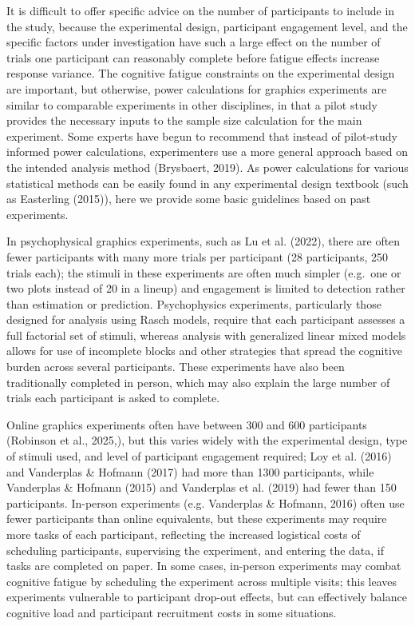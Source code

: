 \documentclass[
  10pt,
  letterpaper,
  DIV=11,
  numbers=noendperiod]{scrartcl}
\begin{document}
It is difficult to offer specific advice on the number of participants
to include in the study, because the experimental design, participant
engagement level, and the specific factors under investigation have such
a large effect on the number of trials one participant can reasonably
complete before fatigue effects increase response variance. The
cognitive fatigue constraints on the experimental design are important,
but otherwise, power calculations for graphics experiments are similar
to comparable experiments in other disciplines, in that a pilot study
provides the necessary inputs to the sample size calculation for the
main experiment. Some experts have begun to recommend that instead of
pilot-study informed power calculations, experimenters use a more
general approach based on the intended analysis method (Brysbaert,
2019). As power calculations for various statistical methods can be
easily found in any experimental design textbook (such as Easterling
(2015)), here we provide some basic guidelines based on past
experiments.

In psychophysical graphics experiments, such as Lu et al. (2022), there
are often fewer participants with many more trials per participant (28
participants, 250 trials each); the stimuli in these experiments are
often much simpler (e.g.~one or two plots instead of 20 in a lineup) and
engagement is limited to detection rather than estimation or prediction.
Psychophysics experiments, particularly those designed for analysis
using Rasch models, require that each participant assesses a full
factorial set of stimuli, whereas analysis with generalized linear mixed
models allows for use of incomplete blocks and other strategies that
spread the cognitive burden across several participants. These
experiments have also been traditionally completed in person, which may
also explain the large number of trials each participant is asked to
complete.

Online graphics experiments often have between 300 and 600 participants
(Robinson et al., 2025,), but this varies widely with the experimental
design, type of stimuli used, and level of participant engagement
required; Loy et al. (2016) and Vanderplas \& Hofmann (2017) had more
than 1300 participants, while Vanderplas \& Hofmann (2015) and
Vanderplas et al. (2019) had fewer than 150 participants. In-person
experiments (e.g. Vanderplas \& Hofmann, 2016) often use fewer
participants than online equivalents, but these experiments may require
more tasks of each participant, reflecting the increased logistical
costs of scheduling participants, supervising the experiment, and
entering the data, if tasks are completed on paper. In some cases,
in-person experiments may combat cognitive fatigue by scheduling the
experiment across multiple visits; this leaves experiments vulnerable to
participant drop-out effects, but can effectively balance cognitive load
and participant recruitment costs in some situations.
\end{document}
